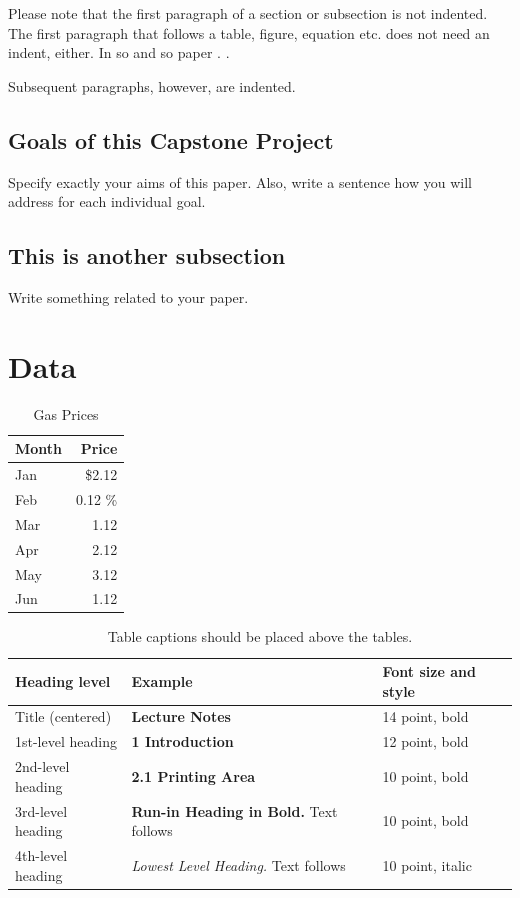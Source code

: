 \documentclass[runningheads]{llncs}
\begin{document}
Please note that the first paragraph of a section or subsection is
not indented. The first paragraph that follows a table, figure,
equation etc. does not need an indent, either. In so and so paper \cite{chmielewski2015trucks}. \cite{website03}.

Subsequent paragraphs, however, are indented.

\subsection{Goals of this Capstone Project} 
Specify exactly your aims of this paper. Also, write a sentence how you will address for each individual goal.

\subsection{This is another subsection}
Write something related to your paper.

\section{Data}


\begin{table}
\caption{Gas Prices}\label{gasprice}
\begin{tabular}{|l|r|}
\hline
Month &  Price \\
\hline
Jan &  \$2.12 \\
Feb &  0.12 \% \\
\hline
Mar &  1.12 \\
\hline
Apr &  2.12 \\
May &  3.12 \\
Jun &  1.12 \\

\hline
\end{tabular}
\end{table}



\begin{table}
\caption{Table captions should be placed above the
tables.}\label{tab1}
\begin{tabular}{|l|l|l|}
\hline
Heading level &  Example & Font size and style\\
\hline
Title (centered) &  {\Large\bfseries Lecture Notes} & 14 point, bold\\
1st-level heading &  {\large\bfseries 1 Introduction} & 12 point, bold\\
2nd-level heading & {\bfseries 2.1 Printing Area} & 10 point, bold\\
3rd-level heading & {\bfseries Run-in Heading in Bold.} Text follows & 10 point, bold\\
4th-level heading & {\itshape Lowest Level Heading.} Text follows & 10 point, italic\\
\hline
\end{tabular}
\end{table}
\end{document}
